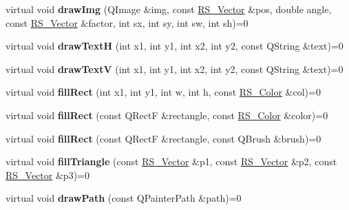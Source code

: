 \begin{DoxyCompactItemize}
\item 
\hypertarget{classRS__Painter_a77fbdfab54b1be74f1b17b245171e378}{virtual void {\bfseries draw\-Img} (Q\-Image \&img, const \hyperlink{classRS__Vector}{R\-S\-\_\-\-Vector} \&pos, double angle, const \hyperlink{classRS__Vector}{R\-S\-\_\-\-Vector} \&factor, int sx, int sy, int sw, int sh)=0}\label{classRS__Painter_a77fbdfab54b1be74f1b17b245171e378}

\item 
\hypertarget{classRS__Painter_a31fd58bdf5451d6d265f144f09ebed3a}{virtual void {\bfseries draw\-Text\-H} (int x1, int y1, int x2, int y2, const Q\-String \&text)=0}\label{classRS__Painter_a31fd58bdf5451d6d265f144f09ebed3a}

\item 
\hypertarget{classRS__Painter_a34752eff7bfabd45d2bf9a8b5ef87020}{virtual void {\bfseries draw\-Text\-V} (int x1, int y1, int x2, int y2, const Q\-String \&text)=0}\label{classRS__Painter_a34752eff7bfabd45d2bf9a8b5ef87020}

\item 
\hypertarget{classRS__Painter_aa1cb9ce06be9a432c4e96e279f2aeb98}{virtual void {\bfseries fill\-Rect} (int x1, int y1, int w, int h, const \hyperlink{classRS__Color}{R\-S\-\_\-\-Color} \&col)=0}\label{classRS__Painter_aa1cb9ce06be9a432c4e96e279f2aeb98}

\item 
\hypertarget{classRS__Painter_acecefb7c38745f731042da81d566fc59}{virtual void {\bfseries fill\-Rect} (const Q\-Rect\-F \&rectangle, const \hyperlink{classRS__Color}{R\-S\-\_\-\-Color} \&color)=0}\label{classRS__Painter_acecefb7c38745f731042da81d566fc59}

\item 
\hypertarget{classRS__Painter_a11352f2e365ac4ff5b1f75afca74937b}{virtual void {\bfseries fill\-Rect} (const Q\-Rect\-F \&rectangle, const Q\-Brush \&brush)=0}\label{classRS__Painter_a11352f2e365ac4ff5b1f75afca74937b}

\item 
\hypertarget{classRS__Painter_ae3e44c750fdad1b2f4e0c24d73a4d6e8}{virtual void {\bfseries fill\-Triangle} (const \hyperlink{classRS__Vector}{R\-S\-\_\-\-Vector} \&p1, const \hyperlink{classRS__Vector}{R\-S\-\_\-\-Vector} \&p2, const \hyperlink{classRS__Vector}{R\-S\-\_\-\-Vector} \&p3)=0}\label{classRS__Painter_ae3e44c750fdad1b2f4e0c24d73a4d6e8}

\item 
\hypertarget{classRS__Painter_a052902d6ed41576fd0473d60f9eb3ae1}{virtual void {\bfseries draw\-Path} (const Q\-Painter\-Path \&path)=0}\label{classRS__Painter_a052902d6ed41576fd0473d60f9eb3ae1}


\end{DoxyCompactItemize}
